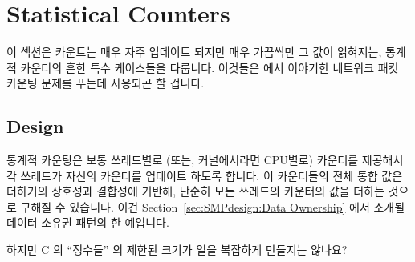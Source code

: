 \section{Statistical Counters}
\label{sec:count:Statistical Counters}

이 섹션은 카운트는 매우 자주 업데이트 되지만 매우 가끔씩만 그 값이 읽혀지는,
통계적 카운터의 흔한 특수 케이스들을 다룹니다.
이것들은 \QuickQuizRef{\QcountQstatcnt} 에서 이야기한 네트워크 패킷 카운팅
문제를 푸는데 사용되곤 할 겁니다.

\subsection{Design}

통계적 카운팅은 보통 쓰레드별로 (또는, 커널에서라면 CPU별로) 카운터를 제공해서
각 쓰레드가 자신의 카운터를 업데이트 하도록 합니다.
이 카운터들의 전체 통합 값은 더하기의 상호성과 결합성에 기반해, 단순히 모든
쓰레드의 카운터의 값을 더하는 것으로 구해질 수 있습니다.
이건 Section~\ref{sec:SMPdesign:Data Ownership} 에서 소개될 데이터 소유권
패턴의 한 예입니다.

\QuickQuiz{}
	하지만 C 의 ``정수들'' 의 제한된 크기가 일을 복잡하게 만들지는 않나요?
	\iffalse

